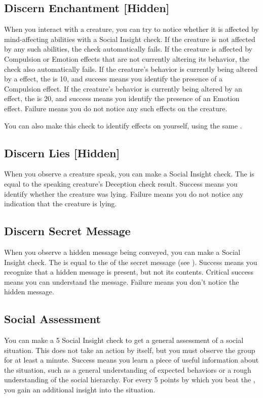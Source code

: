     \subsection{Discern Enchantment [Hidden]}
        When you interact with a creature, you can try to notice whether it is affected by mind-affecting abilities with a Social Insight check.
        If the creature is not affected by any such abilities, the check automatically fails.
        If the creature is affected by Compulsion or Emotion effects that are not currently altering its behavior, the check also automatically fails.
        If the creature's behavior is currently being altered by a  effect, the  is 10, and success means you identify the presence of a Compulsion effect.
        If the creature's behavior is currently being altered by an  effect, the  is 20, and success means you identify the presence of an Emotion effect.
        Failure means you do not notice any such effects on the creature.

        You can also make this check to identify  effects on yourself, using the same .

    \subsection{Discern Lies [Hidden]}
        When you observe a creature speak, you can make a Social Insight check.
        The  is equal to the speaking creature's Deception check result.
        Success means you identify whether the creature was lying.
        Failure means you do not notice any indication that the creature is lying.

    \subsection{Discern Secret Message}
        When you observe a hidden message being conveyed, you can make a Social Insight check.
        The  is equal to the  of the secret message (see ).
        Success means you recognize that a hidden message is present, but not its contents.
        Critical success means you can understand the message.
        Failure means you don't notice the hidden message.

    \subsection{Social Assessment}\label{Social Assessment}
        You can make a  5 Social Insight check to get a general assessment of a social situation.
        This does not take an action by itself, but you must observe the group for at least a minute.
        Success means you learn a piece of useful information about the situation, such as a general understanding of expected behaviors or a rough understanding of the social hierarchy.
        For every 5 points by which you beat the , you gain an additional insight into the situation.

